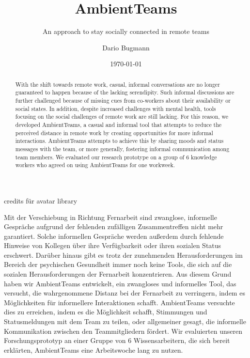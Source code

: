 \documentclass{seal_thesis}
\date{\today}
\title{AmbientTeams}
\subtitle{An approach to stay socially connected in remote teams}
\author{Dario Bugmann}
\begin{document}
\maketitle

\frontmatter

\begin{acknowledgements}
    credits für avatar library
\end{acknowledgements}

\begin{abstract}
    With the shift towards remote work, casual, informal conversations are no longer guaranteed to happen because of the lacking serendipity. Such informal discussions are further challenged because of missing cues from co-workers about their availability or social states. In addition, despite increased challenges with mental health, tools focusing on the social challenges of remote work are still lacking. For this reason, we developed AmbientTeams, a casual and informal tool that attempts to reduce the perceived distance in remote work by creating opportunities for more informal interactions. AmbientTeams attempts to achieve this by sharing moods and status messages with the team, or more generally, fostering informal communication among team members. We evaluated our research prototype on a group of 6 knowledge workers who agreed on using AmbientTeams for one workweek.
\end{abstract}

\begin{zusammenfassung}
    Mit der Verschiebung in Richtung Fernarbeit sind zwanglose, informelle Gespräche aufgrund der fehlenden zufälligen Zusammentreffen nicht mehr garantiert. Solche informellen Gespräche werden außerdem durch fehlende Hinweise von Kollegen über ihre Verfügbarkeit oder ihren sozialen Status erschwert. Darüber hinaus gibt es trotz der zunehmenden Herausforderungen im Bereich der psychischen Gesundheit immer noch keine Tools, die sich auf die sozialen Herausforderungen der Fernarbeit konzentrieren. Aus diesem Grund haben wir AmbientTeams entwickelt, ein zwangloses und informelles Tool, das versucht, die wahrgenommene Distanz bei der Fernarbeit zu verringern, indem es Möglichkeiten für informellere Interaktionen schafft. AmbientTeams versuchte dies zu erreichen, indem es die Möglichkeit schafft, Stimmungen und Statusmeldungen mit dem Team zu teilen, oder allgemeiner gesagt, die informelle Kommunikation zwischen den Teammitgliedern fördert. Wir evaluierten unseren Forschungsprototyp an einer Gruppe von 6 Wissensarbeitern, die sich bereit erklärten, AmbientTeams eine Arbeitswoche lang zu nutzen.
\end{zusammenfassung}
\end{document}

